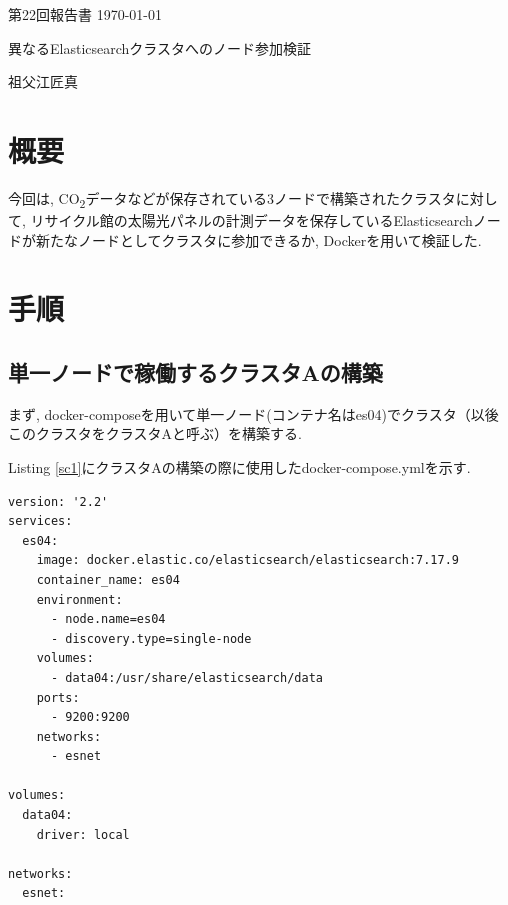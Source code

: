 \documentclass[a4j,12pt,]{jarticle}
\begin{document}
{\noindent\small 第22回報告書 \hfill\today}
\begin{center}
  {\Large 異なるElasticsearchクラスタへのノード参加検証}
\end{center}
\begin{flushright}
  祖父江匠真 \\
\end{flushright}

\section{概要}
今回は, CO\textsubscript{2}データなどが保存されている3ノードで構築されたクラスタに対して, リサイクル館の太陽光パネルの計測データを保存しているElasticsearchノードが新たなノードとしてクラスタに参加できるか, Dockerを用いて検証した.

\section{手順}

\subsection{単一ノードで稼働するクラスタAの構築}

まず, docker-composeを用いて単一ノード(コンテナ名はes04)でクラスタ（以後このクラスタをクラスタAと呼ぶ）を構築する.

Listing \ref{sc1}にクラスタAの構築の際に使用したdocker-compose.ymlを示す.


\begin{lstlisting}[caption=クラスタAの構築の際に使用したdocker-compose.yml, label=sc1]
version: '2.2'
services:
  es04:
    image: docker.elastic.co/elasticsearch/elasticsearch:7.17.9
    container_name: es04
    environment:
      - node.name=es04
      - discovery.type=single-node
    volumes:
      - data04:/usr/share/elasticsearch/data
    ports:
      - 9200:9200
    networks:
      - esnet

volumes:
  data04:
    driver: local

networks:
  esnet:
\end{lstlisting}
\end{document}

